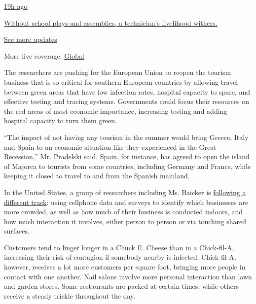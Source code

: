 \href{https://www.nytimes3xbfgragh.onion/live/2020/08/20/business/stock-market-today-coronavirus?action=click\&pgtype=Article\&state=default\&region=MAIN_CONTENT_1\&context=storylines_live_updates\#without-school-plays-and-assemblies-a-technicians-livelihood-withers}{19h
ago}

\href{https://www.nytimes3xbfgragh.onion/live/2020/08/20/business/stock-market-today-coronavirus?action=click\&pgtype=Article\&state=default\&region=MAIN_CONTENT_1\&context=storylines_live_updates\#without-school-plays-and-assemblies-a-technicians-livelihood-withers}{Without
school plays and assemblies, a technician's livelihood withers.}

\href{https://www.nytimes3xbfgragh.onion/live/2020/08/20/business/stock-market-today-coronavirus?action=click\&pgtype=Article\&state=default\&region=MAIN_CONTENT_1\&context=storylines_live_updates}{See
more updates}

More live coverage:
\href{https://www.nytimes3xbfgragh.onion/2020/08/20/world/coronavirus-covid.html?action=click\&pgtype=Article\&state=default\&region=MAIN_CONTENT_1\&context=storylines_live_updates}{Global}

The researchers are pushing for the European Union to reopen the tourism
business that is so critical for southern European countries by allowing
travel between green areas that have low infection rates, hospital
capacity to spare, and effective testing and tracing systems.
Governments could focus their resources on the red areas of most
economic importance, increasing testing and adding hospital capacity to
turn them green.

``The impact of not having any tourism in the summer would bring Greece,
Italy and Spain to an economic situation like they experienced in the
Great Recession,'' Mr. Pradelski said. Spain, for instance, has agreed
to open the island of Majorca to tourists from some countries, including
Germany and France, while keeping it closed to travel to and from the
Spanish mainland.

In the United States, a group of researchers including Ms. Baicker is
\href{https://www.nytimes3xbfgragh.onion/interactive/2020/05/06/opinion/coronavirus-us-reopen.html}{following
a different track}: using cellphone data and surveys to identify which
businesses are more crowded, as well as how much of their business is
conducted indoors, and how much interaction it involves, either person
to person or via touching shared surfaces.

Customers tend to linger longer in a Chuck E. Cheese than in a
Chick-fil-A, increasing their risk of contagion if somebody nearby is
infected. Chick-fil-A, however, receives a lot more customers per square
foot, bringing more people in contact with one another. Nail salons
involve more personal interaction than lawn and garden stores. Some
restaurants are packed at certain times, while others receive a steady
trickle throughout the day.

